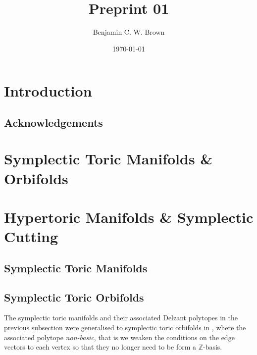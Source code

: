 \documentclass[11pt]{amsart}
\title{Preprint 01}
\author{Benjamin C. W. Brown}
\date{\today}
\newcommand{\ZZ}{\mathbb{Z}}
\begin{document}
\begin{abstract}

\end{abstract}

\maketitle

\section{Introduction}

\subsection*{Acknowledgements}  

\section{Symplectic Toric Manifolds \& Orbifolds} \label{sec:symplectic-toric-manifolds-orbifolds}

\section{Hypertoric Manifolds \& Symplectic Cutting} \label{sec:hypertoric-manifolds-symplectic-cutting}



\subsection{Symplectic Toric Manifolds} \label{subsec:toric-manifolds}

\subsection{Symplectic Toric Orbifolds} \label{subsec:toric-orbifolds}

The symplectic toric manifolds and their associated Delzant polytopes in the previous subsection were generalised to symplectic toric orbifolds in \cite{LT-1997}, where the associated polytope \emph{non-basic}, that is we weaken the conditions on the edge vectors to each vertex so that they no longer need to be form a $\ZZ$-basis.
\end{document}
